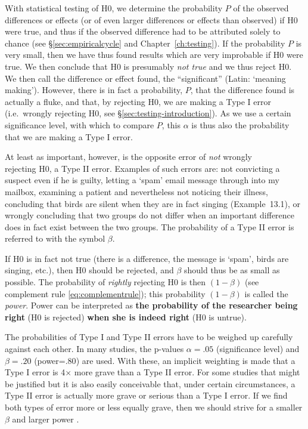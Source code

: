 \documentclass[
]{book}
\begin{document}
With statistical testing of H0, we determine the probability \(P\) of the
observed differences or effects (or of even larger differences or effects
than observed) if H0 were true, and thus if
the observed difference had to be attributed solely to chance
(see §\ref{sec:empiricalcycle} and
Chapter~\ref{ch:testing}). If the probability \(P\) is very small, then
we have thus found results which are very improbable if H0 were true.
We then conclude that H0 is presumably \emph{not true} and we thus reject
H0. We then call the difference or effect found, the ``significant''
(Latin: `meaning making'). However, there is in fact a probability,
\(P\), that the difference found is actually a fluke, and that, by rejecting
H0, we are making a Type I error (i.e.~wrongly rejecting H0,
see
§\ref{sec:testing-introduction}). As we use a certain
significance level, with which to compare \(P\), this \(\alpha\)
is thus also the probability that we are making a Type I error.

At least as important, however, is the opposite error of \emph{not} wrongly\\
rejecting H0, a Type II error. Examples of such errors are:
not convicting a suspect even if he is guilty, letting a `spam'
email message through into my mailbox, examining a patient and nevertheless
not noticing their illness, concluding that birds are silent when
they are in fact singing
(Example~13.1), or wrongly concluding that two
groups do not differ when an important difference does in fact exist
between the two groups. The probability of a Type II error is referred to
with the symbol \(\beta\).

If H0 is in fact not true (there is a difference, the message is `spam',
birds are singing, etc.), then H0 should be rejected, and
\(\beta\) should thus be as small as possible. The probability of \emph{rightly}
rejecting H0 is then \((1-\beta)\) (see complement rule \eqref{eq:complementrule});
this probability \((1-\beta)\) is called the \emph{power}.
Power can be interpreted as \textbf{the probability of the researcher
being right} (H0 is rejected) \textbf{when she is indeed right} (H0 is untrue).

The probabilities of Type I and Type II errors have to be weighed up
carefully against each other. In many studies, the p-values
\(\alpha=.05\) (significance level) and \(\beta=.20\)
(power=\(.80\)) are used. With these, an implicit weighting is made
that a Type I error is 4× more grave than a Type II error.
For some studies that might be justified but it is also easily
conceivable that, under certain circumstances, a Type II error is
actually more grave or serious than a Type I error. If we find both types of
error more or less equally grave, then we should strive for
a smaller \(\beta\) and larger power \citep{Rose08}.
\end{document}
